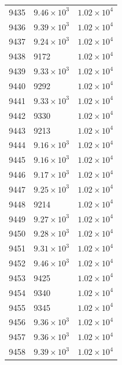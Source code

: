 \begin{table}[H]
\begin{tabular}{lll}
9435 & $\displaystyle 9.46 \times 10^{3}$ & $\displaystyle 1.02 \times 10^{4}$ \\
9436 & $\displaystyle 9.39 \times 10^{3}$ & $\displaystyle 1.02 \times 10^{4}$ \\
9437 & $\displaystyle 9.24 \times 10^{3}$ & $\displaystyle 1.02 \times 10^{4}$ \\
9438 & 9172 & $\displaystyle 1.02 \times 10^{4}$ \\
9439 & $\displaystyle 9.33 \times 10^{3}$ & $\displaystyle 1.02 \times 10^{4}$ \\
9440 & 9292 & $\displaystyle 1.02 \times 10^{4}$ \\
9441 & $\displaystyle 9.33 \times 10^{3}$ & $\displaystyle 1.02 \times 10^{4}$ \\
9442 & 9330 & $\displaystyle 1.02 \times 10^{4}$ \\
9443 & 9213 & $\displaystyle 1.02 \times 10^{4}$ \\
9444 & $\displaystyle 9.16 \times 10^{3}$ & $\displaystyle 1.02 \times 10^{4}$ \\
9445 & $\displaystyle 9.16 \times 10^{3}$ & $\displaystyle 1.02 \times 10^{4}$ \\
9446 & $\displaystyle 9.17 \times 10^{3}$ & $\displaystyle 1.02 \times 10^{4}$ \\
9447 & $\displaystyle 9.25 \times 10^{3}$ & $\displaystyle 1.02 \times 10^{4}$ \\
9448 & 9214 & $\displaystyle 1.02 \times 10^{4}$ \\
9449 & $\displaystyle 9.27 \times 10^{3}$ & $\displaystyle 1.02 \times 10^{4}$ \\
9450 & $\displaystyle 9.28 \times 10^{3}$ & $\displaystyle 1.02 \times 10^{4}$ \\
9451 & $\displaystyle 9.31 \times 10^{3}$ & $\displaystyle 1.02 \times 10^{4}$ \\
9452 & $\displaystyle 9.46 \times 10^{3}$ & $\displaystyle 1.02 \times 10^{4}$ \\
9453 & 9425 & $\displaystyle 1.02 \times 10^{4}$ \\
9454 & 9340 & $\displaystyle 1.02 \times 10^{4}$ \\
9455 & 9345 & $\displaystyle 1.02 \times 10^{4}$ \\
9456 & $\displaystyle 9.36 \times 10^{3}$ & $\displaystyle 1.02 \times 10^{4}$ \\
9457 & $\displaystyle 9.36 \times 10^{3}$ & $\displaystyle 1.02 \times 10^{4}$ \\
9458 & $\displaystyle 9.39 \times 10^{3}$ & $\displaystyle 1.02 \times 10^{4}$ \\

\end{tabular}
\end{table}
